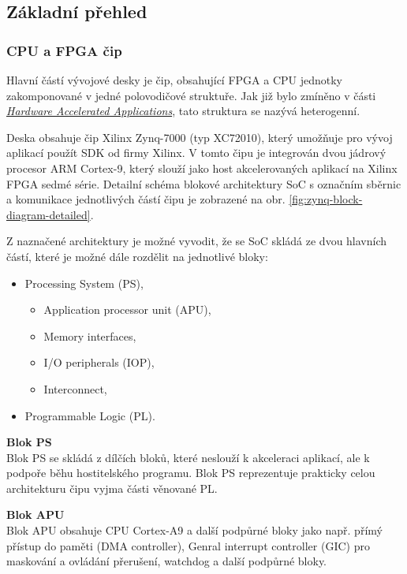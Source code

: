 \documentclass[a4paper, twoside, 11pt]{article}
\begin{document}
		\subsection{Základní přehled}
		\subsubsection{CPU a FPGA čip}
			Hlavní částí vývojové desky je čip, obsahující FPGA a CPU jednotky zakomponované v jedné polovodičové struktuře. Jak již bylo zmíněno v části \hyperref[subsec:hardware-accelerated-applications]{\textit{Hardware Accelerated Applications}}, tato struktura se nazývá heterogenní.\par
			Deska obsahuje čip Xilinx Zynq-7000 (typ XC72010), který umožňuje pro vývoj aplikací použít SDK od firmy Xilinx. V tomto čipu je integrován dvou jádrový procesor ARM Cortex-9, který slouží jako host akcelerovaných aplikací na Xilinx FPGA sedmé série. Detailní schéma blokové architektury SoC s označním sběrnic a komunikace jednotlivých částí čipu je zobrazené na obr. \ref{fig:zynq-block-diagram-detailed}.\par
			Z naznačené architektury je možné vyvodit, že se SoC skládá ze dvou hlavních částí, které je možné dále rozdělit na jednotlivé bloky:
			\begin{itemize}
				\item Processing System (PS),
				\begin{itemize}
					\item Application processor unit (APU),
					\item Memory interfaces,
					\item I/O peripherals (IOP),
					\item Interconnect,
				\end{itemize}
				\item Programmable Logic (PL).
			\end{itemize}
			\vspace*{0.25cm}
			\noindent\textbf{Blok PS}\\
			Blok PS se skládá z dílčích bloků, které neslouží k akceleraci aplikací, ale k podpoře běhu hostitelského programu. Blok PS reprezentuje prakticky celou architekturu čipu vyjma části věnované PL.\par\vspace*{0.25cm}
			\noindent\textbf{Blok APU}\\
			Blok APU obsahuje CPU Cortex-A9 a další podpůrné bloky jako např. přímý přístup do paměti (DMA controller), Genral interrupt controller (GIC) pro maskování a ovládání přerušení, watchdog a další podpůrné bloky.\par\vspace*{0.25cm}
\end{document}
